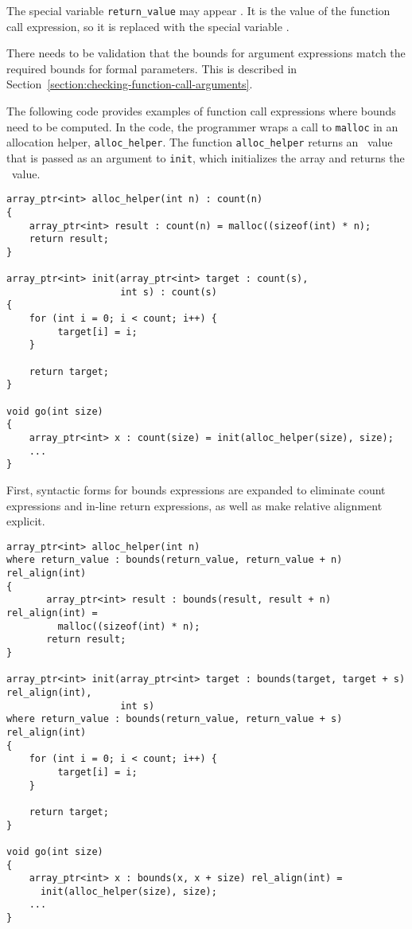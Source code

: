 The special variable \texttt{return\_value} may appear . It
is the value of the function call expression, so it is replaced with the
special variable \exprcurrentvalue.

There needs to be validation that the bounds for argument expressions
match the required bounds for formal parameters. This is described in
Section~\ref{section:checking-function-call-arguments}.

The following code provides examples of function call expressions where
bounds need to be computed. In the code, the programmer wraps a call to
\texttt{malloc} in an allocation helper, \texttt{alloc\_helper}. The
function \texttt{alloc\_helper} returns an \arrayptr\ value
that is passed as an argument to \texttt{init}, which initializes the array
and returns the \arrayptr\ value.
\begin{verbatim}
array_ptr<int> alloc_helper(int n) : count(n)
{
    array_ptr<int> result : count(n) = malloc((sizeof(int) * n);
    return result;
}

array_ptr<int> init(array_ptr<int> target : count(s), 
                    int s) : count(s)
{
    for (int i = 0; i < count; i++) {
         target[i] = i;
    }

    return target;
}

void go(int size) 
{
    array_ptr<int> x : count(size) = init(alloc_helper(size), size);
    ...
}
\end{verbatim}

First, syntactic forms for bounds expressions are expanded to eliminate
count expressions and in-line return expressions, as well as make
relative alignment explicit.

\begin{verbatim}
array_ptr<int> alloc_helper(int n)
where return_value : bounds(return_value, return_value + n) rel_align(int)
{
       array_ptr<int> result : bounds(result, result + n) rel_align(int) =
         malloc((sizeof(int) * n);
       return result;
}

array_ptr<int> init(array_ptr<int> target : bounds(target, target + s) rel_align(int), 
                    int s) 
where return_value : bounds(return_value, return_value + s) rel_align(int)
{
    for (int i = 0; i < count; i++) {
         target[i] = i;
    }

    return target;
}

void go(int size) 
{
    array_ptr<int> x : bounds(x, x + size) rel_align(int) = 
      init(alloc_helper(size), size);
    ...
}
\end{verbatim}

